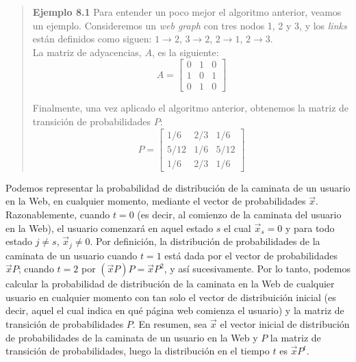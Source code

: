 			\begin{quote}
				\textbf{Ejemplo 8.1} Para entender un poco mejor el algoritmo anterior, veamos un ejemplo. Consideremos un \textit{web graph} con tres nodos 1, 2 y 3, y los \textit{links} están definidos como siguen: $1 \rightarrow 2$, $3 \rightarrow 2$, $2 \rightarrow 1$, $2 \rightarrow 3$. \\
				La matriz de adyacencias, $A$, es la siguiente:
				\[
				A =
				\begin{bmatrix}
					0 & 1 & 0 \\
					1 & 0 & 1 \\
					0 & 1 & 0
				\end{bmatrix}
				\]
				
				Finalmente, una vez aplicado el algoritmo anterior, obtenemos la matriz de transición de probabilidades $P$:
				\[
				P =
				\begin{bmatrix}
					1/6 & 2/3 & 1/6 \\
					5/12 & 1/6 & 5/12 \\
					1/6 & 2/3 & 1/6
				\end{bmatrix}
				\]
			\end{quote}
			
			Podemos representar la probabilidad de distribución de la caminata de un usuario en la Web, en cualquier momento, mediante el vector de probabilidades $\vec{x}$. Razonablemente, cuando $t = 0$ (es decir, al comienzo de la caminata del usuario en la Web), el usuario comenzará en aquel estado $s$ el cual $\vec{x}_s = 0$ y para todo estado $j \neq s$, $\vec{x}_j \neq 0$. Por definición, la distribución de probabilidades de la caminata de un usuario cuando $t = 1$ está dada por el vector de probabilidades $\vec{x}P$; cuando $t = 2$ por $(\vec{x}P)P = \vec{x}P^{2}$, y así sucesivamente. Por lo tanto, podemos calcular la probabilidad de distribución de la caminata en la Web de cualquier usuario en cualquier momento con tan solo el vector de distribuición inicial (es decir, aquel el cual indica en qué página web comienza el usuario) y la matriz de transición de probabilidades $P$. En resumen, sea $\vec{x}$ el vector inicial de distribución de probabilidades de la caminata de un usuario en la Web y $P$ la matriz de transición de probabilidades, luego la distribución en el tiempo $t$ es $\vec{x}P^{t}$. \par
			
